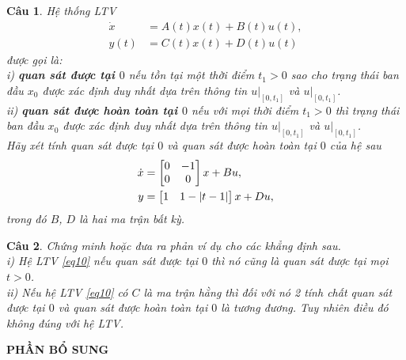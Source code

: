 \documentclass[11pt]{article}
\newtheorem{bt}{Câu}
\begin{document}
\begin{bt} Hệ thống LTV 
%
\begin{equation}\label{eq10}
	\begin{aligned}
		\dot{x} &= A(t)x(t) + B(t)u(t), \\
		y(t) &= C(t)x(t) + D(t)u(t)
	\end{aligned}
\end{equation}
%
được gọi là: \\ 
i) 	\textbf{quan sát được tại $0$} nếu tồn tại một thời điểm $t_1 > 0$ sao cho trạng thái ban đầu $x_0$ được xác định duy nhất dựa trên thông tin $u|_{[0,t_1]}$ và $u|_{[0,t_1]}$. \\
ii) \textbf{quan sát được hoàn toàn tại $0$} nếu với mọi thời điểm $t_1 > 0$ thì trạng thái ban đầu $x_0$ được xác định duy nhất dựa trên thông tin $u|_{[0,t_1]}$ và $u|_{[0,t_1]}$. \\
Hãy xét tính quan sát được tại $0$ và quan sát được hoàn toàn tại $0$ của hệ sau
\begin{align*}
\dot{x} &= \begin{bmatrix} 0 & -1\\0 & 0 \end{bmatrix} x + Bu, \\
y &= \begin{bmatrix} 1 & 1 - |t-1| \end{bmatrix} x + Du,
\end{align*}
trong đó $B$, $D$ là hai ma trận bất kỳ. 
\end{bt}

\begin{bt} Chứng minh hoặc đưa ra phản ví dụ cho các khẳng định sau.\\
i) Hệ LTV \eqref{eq10} nếu quan sát được tại $0$ thì nó cũng là quan sát được tại mọi $t>0$. \\
ii) Nếu hệ LTV \eqref{eq10} có $C$ là ma trận hằng thì đối với nó 2 tính chất quan sát được tại $0$ và quan sát được hoàn toàn tại $0$ là tương đương. Tuy nhiên điều đó không đúng với hệ LTV.
\end{bt}

\begin{center}
\textbf{PHẦN BỔ SUNG}	
\end{center}
\end{document}
